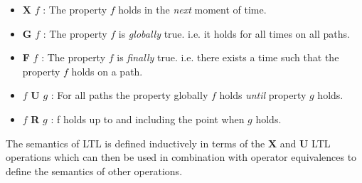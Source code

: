 \begin{itemize}
\item \textbf{X} $f$ : The property $f$ holds in the \emph{next} moment of time.
\item \textbf{G} $f$ : The property $f$ is \emph{globally} true. i.e. it holds for all times on all paths. 
\item \textbf{F} $f$ : The property $f$ is \emph{finally} true. i.e. there exists a time such that the property $f$ holds on a path.
\item $f$ \textbf{U} $g$ : For all paths the property globally $f$ holds \emph{until} property $g$ holds. 
\item $f$ \textbf{R} $g$ : f holds up to and including the point when $g$ holds.
\end{itemize}

The semantics of LTL is defined inductively in terms of the $\mathbf{X}$ and $\mathbf{U}$ LTL operations which can then be used in combination with operator equivalences to define the semantics of other operations.
 
